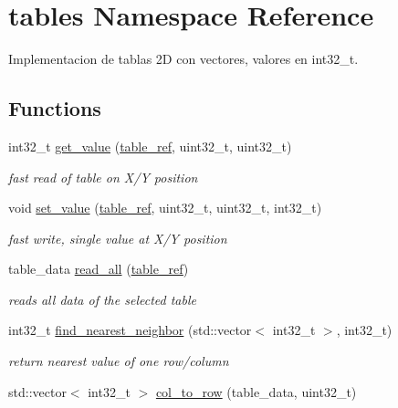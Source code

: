 \hypertarget{namespacetables}{}\section{tables Namespace Reference}
\label{namespacetables}


Implementacion de tablas 2D con vectores, valores en int32\+\_\+t.  


\subsection*{Functions}
\begin{DoxyCompactItemize}
\item 
int32\+\_\+t \hyperlink{namespacetables_a4a112a2cfd09a3993a24598bf087ccba}{get\+\_\+value} (\hyperlink{structtable__ref}{table\+\_\+ref}, uint32\+\_\+t, uint32\+\_\+t)
\begin{DoxyCompactList}\small\item\em fast read of table on X/Y position \end{DoxyCompactList}\item 
\mbox{\label{namespacetables_a5f4f21d540c39cce3e7850a12316d98a}} 
void \hyperlink{namespacetables_a5f4f21d540c39cce3e7850a12316d98a}{set\+\_\+value} (\hyperlink{structtable__ref}{table\+\_\+ref}, uint32\+\_\+t, uint32\+\_\+t, int32\+\_\+t)
\begin{DoxyCompactList}\small\item\em fast write, single value at X/Y position \end{DoxyCompactList}\item 
table\+\_\+data \hyperlink{namespacetables_a27170b1a1036e75516b990dc97ea5835}{read\+\_\+all} (\hyperlink{structtable__ref}{table\+\_\+ref})
\begin{DoxyCompactList}\small\item\em reads all data of the selected table \end{DoxyCompactList}\item 
int32\+\_\+t \hyperlink{namespacetables_a56f811fc2ad9ddcc8580af63abb9c200}{find\+\_\+nearest\+\_\+neighbor} (std\+::vector$<$ int32\+\_\+t $>$, int32\+\_\+t)
\begin{DoxyCompactList}\small\item\em return nearest value of one row/column \end{DoxyCompactList}\item 
std\+::vector$<$ int32\+\_\+t $>$ \hyperlink{namespacetables_af34bc025bc426995866a34ecbe393978}{col\+\_\+to\+\_\+row} (table\+\_\+data, uint32\+\_\+t)

\end{DoxyCompactItemize}
